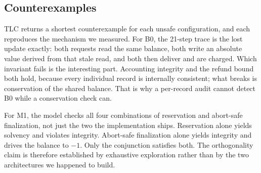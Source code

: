 \documentclass[manuscript,review]{acmart}
\begin{document}
\begin{table}[t]
\centering
\caption{TLC model-checking results across ten architecture configurations and four
invariants. All 40 outcomes matched the expectation declared before the run.}
\label{tab:formalmatrix}
\end{table}

\subsection{Counterexamples}
TLC returns a shortest counterexample for each unsafe configuration, and each reproduces
the mechanism we measured. For B0, the 21-step trace is the lost update exactly: both
requests read the same balance, both write an absolute value derived from that stale
read, and both then deliver and are charged. Which invariant fails is the interesting
part. Accounting integrity and the refund bound both hold, because every individual
record is internally consistent; what breaks is conservation of the shared balance. That
is why a per-record audit cannot detect B0 while a conservation check can.

For M1, the model checks all four combinations of reservation and abort-safe
finalization, not just the two the implementation ships. Reservation alone yields
solvency and violates integrity. Abort-safe finalization alone yields integrity and
drives the balance to $-1$. Only the conjunction satisfies both. The orthogonality claim
is therefore established by exhaustive exploration rather than by the two architectures
we happened to build.
\end{document}
